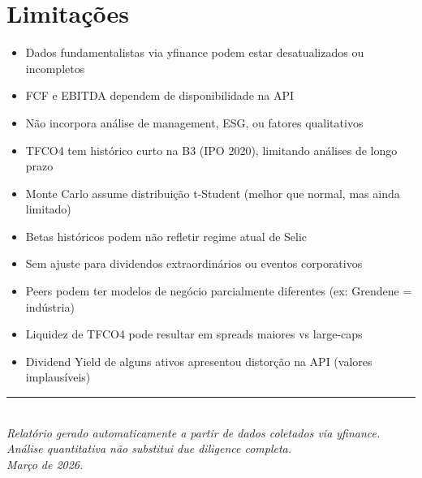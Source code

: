 \documentclass[12pt, a4paper]{article}
\begin{document}
\section{Limitações}

\begin{itemize}[leftmargin=*]
    \item Dados fundamentalistas via yfinance podem estar desatualizados ou incompletos
    \item FCF e EBITDA dependem de disponibilidade na API
    \item Não incorpora análise de management, ESG, ou fatores qualitativos
    \item TFCO4 tem histórico curto na B3 (IPO 2020), limitando análises de longo prazo
    \item Monte Carlo assume distribuição t-Student (melhor que normal, mas ainda limitado)
    \item Betas históricos podem não refletir regime atual de Selic
    \item Sem ajuste para dividendos extraordinários ou eventos corporativos
    \item Peers podem ter modelos de negócio parcialmente diferentes (ex: Grendene = indústria)
    \item Liquidez de TFCO4 pode resultar em spreads maiores vs large-caps
    \item Dividend Yield de alguns ativos apresentou distorção na API (valores implausíveis)
\end{itemize}

\vfill
\begin{center}
\rule{0.5\textwidth}{0.4pt}\\[0.3cm]
{\small\textit{Relatório gerado automaticamente a partir de dados coletados via yfinance.\\
Análise quantitativa não substitui due diligence completa.\\
Março de 2026.}}
\end{center}
\end{document}

